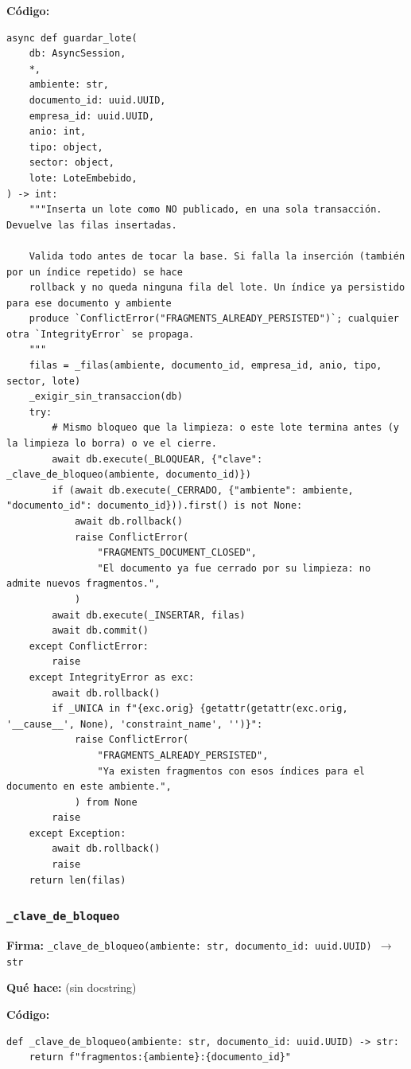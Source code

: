 \documentclass[11pt,a4paper]{article}
\begin{document}
\textbf{Código:}
\begin{lstlisting}
async def guardar_lote(
    db: AsyncSession,
    *,
    ambiente: str,
    documento_id: uuid.UUID,
    empresa_id: uuid.UUID,
    anio: int,
    tipo: object,
    sector: object,
    lote: LoteEmbebido,
) -> int:
    """Inserta un lote como NO publicado, en una sola transacción. Devuelve las filas insertadas.

    Valida todo antes de tocar la base. Si falla la inserción (también por un índice repetido) se hace
    rollback y no queda ninguna fila del lote. Un índice ya persistido para ese documento y ambiente
    produce `ConflictError("FRAGMENTS_ALREADY_PERSISTED")`; cualquier otra `IntegrityError` se propaga.
    """
    filas = _filas(ambiente, documento_id, empresa_id, anio, tipo, sector, lote)
    _exigir_sin_transaccion(db)
    try:
        # Mismo bloqueo que la limpieza: o este lote termina antes (y la limpieza lo borra) o ve el cierre.
        await db.execute(_BLOQUEAR, {"clave": _clave_de_bloqueo(ambiente, documento_id)})
        if (await db.execute(_CERRADO, {"ambiente": ambiente, "documento_id": documento_id})).first() is not None:
            await db.rollback()
            raise ConflictError(
                "FRAGMENTS_DOCUMENT_CLOSED",
                "El documento ya fue cerrado por su limpieza: no admite nuevos fragmentos.",
            )
        await db.execute(_INSERTAR, filas)
        await db.commit()
    except ConflictError:
        raise
    except IntegrityError as exc:
        await db.rollback()
        if _UNICA in f"{exc.orig} {getattr(getattr(exc.orig, '__cause__', None), 'constraint_name', '')}":
            raise ConflictError(
                "FRAGMENTS_ALREADY_PERSISTED",
                "Ya existen fragmentos con esos índices para el documento en este ambiente.",
            ) from None
        raise
    except Exception:
        await db.rollback()
        raise
    return len(filas)
\end{lstlisting}

\subsubsection*{\texttt{\_clave\_de\_bloqueo}}
\textbf{Firma:} \texttt{\_clave\_de\_bloqueo(ambiente: str, documento\_id: uuid.UUID) $\rightarrow$ str}

\textbf{Qué hace:} (sin docstring)

\textbf{Código:}
\begin{lstlisting}
def _clave_de_bloqueo(ambiente: str, documento_id: uuid.UUID) -> str:
    return f"fragmentos:{ambiente}:{documento_id}"
\end{lstlisting}
\end{document}
